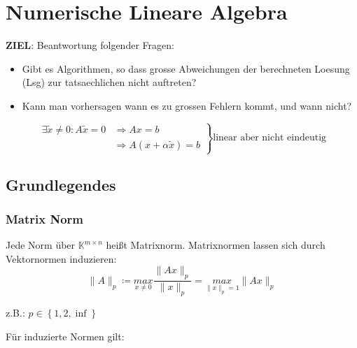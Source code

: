 \section{Numerische Lineare Algebra}
\textbf{ZIEL}: Beantwortung folgender Fragen:
\begin{itemize}
\item{Gibt es Algorithmen, so dass grosse Abweichungen der berechneten Loesung (Lsg) zur tatsaechlichen nicht auftreten?}
\item{Kann man vorhersagen wann es zu grossen Fehlern kommt, und wann nicht?}
\end{itemize}

\begin{equation*}
  \left.
    \begin{align*}
      \exists \widetilde{x} \neq 0: A\widetilde{x} = 0 & \Rightarrow  Ax = b \\
        & \Rightarrow A(x + \alpha \widetilde{x}) = b
    \end{align*}
  \right\}
  \text{linear aber nicht eindeutig}
\end{equation*}

\subsection{Grundlegendes}

\subsubsection{Matrix Norm}

Jede Norm über $\mathbb{K}^{m \times n}$ heißt Matrixnorm.
Matrixnormen lassen sich durch Vektornormen induzieren:
\begin{equation*}
\|A\|_p \coloneqq \underset{x \neq 0}{max} \frac{\|Ax\|_p}{\|x\|_p} = \underset{\|x\|_p = 1}{max}\|Ax\|_p
\end{equation*}

z.B.: $p \in \left\{1, 2, \inf \right\}$

Für induzierte Normen gilt:

